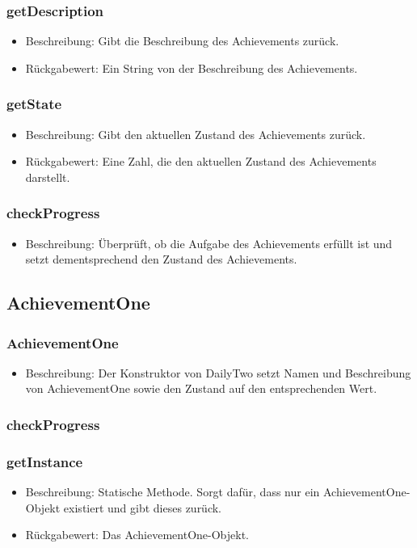 \documentclass[a4paper]{scrreprt}
\begin{document}
	\subsubsection{getDescription}
	\begin{itemize}
		\item Beschreibung: Gibt die Beschreibung des Achievements zurück.
		\item Rückgabewert: Ein String von der Beschreibung des Achievements.
	\end{itemize}
	\subsubsection{getState}
	\begin{itemize}
		\item Beschreibung: Gibt den aktuellen Zustand des Achievements zurück.
		\item Rückgabewert: Eine Zahl, die den aktuellen Zustand des Achievements darstellt.
	\end{itemize}
	\subsubsection{checkProgress}
	\begin{itemize}
		\item Beschreibung: Überprüft, ob die Aufgabe des Achievements erfüllt ist und setzt dementsprechend den Zustand des Achievements.
	\end{itemize}

	\subsection{AchievementOne}
	\subsubsection{AchievementOne}
	\begin{itemize}
		\item Beschreibung: Der Konstruktor von DailyTwo setzt Namen und Beschreibung von AchievementOne sowie den Zustand auf den entsprechenden Wert.
	\end{itemize}
	\subsubsection{checkProgress}
	\subsubsection{getInstance}
	\begin{itemize}
		\item Beschreibung: Statische Methode. Sorgt dafür, dass nur ein AchievementOne-Objekt existiert und gibt dieses zurück.
		\item Rückgabewert: Das AchievementOne-Objekt.
	\end{itemize}
\end{document}
